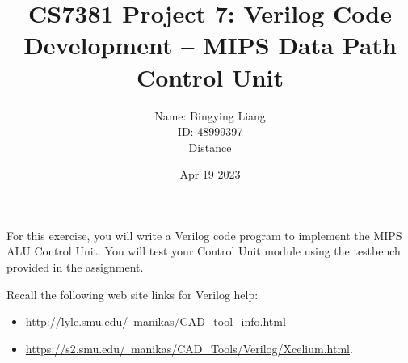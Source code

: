 \documentclass[12pt]{article}
\title{CS7381 Project 7: Verilog Code Development – MIPS Data Path Control Unit }
\author{
Name: Bingying Liang \\
ID: 48999397\\  
Distance}
\date{Apr 19 2023}
\begin{document}
\maketitle
For this exercise, you will write a Verilog code program to implement the MIPS ALU Control Unit.    You will test your Control Unit module using the testbench provided in the assignment. 

Recall the following web site links for Verilog help:
\begin{itemize}
    \item \href{http://lyle.smu.edu/~manikas/CAD_tool_info.html} {http://lyle.smu.edu/~manikas/CAD\_tool\_info.html}
    \item \href{https://s2.smu.edu/~manikas/CAD_Tools/Verilog/Xcelium.html}{https://s2.smu.edu/~manikas/CAD\_Tools/Verilog/Xcelium.html}. 
\end{itemize}
\end{document}
